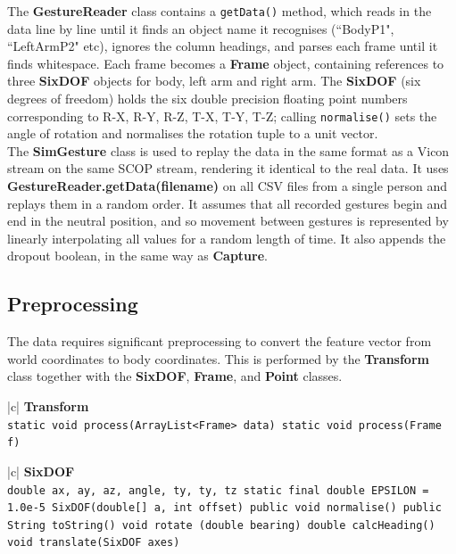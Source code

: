 \documentclass[12pt,a4,notitlepage]{report}
\renewcommand{\_}{\texttt{\symbol{95}}}
\newcommand{\<}{\texttt{\symbol{60}}}
\renewcommand{\>}{\texttt{\symbol{62}}}
\newcommand{\class}[1]{\textbf{#1}}
\newcommand{\variable}[1]{\texttt{#1}}
\begin{document}
The \class{GestureReader} class contains a \variable{getData()} method, which reads in the data line by line until it finds an object name it recognises (``BodyP1", ``LeftArmP2" etc), ignores the column headings, and parses each frame until it finds whitespace. Each frame becomes a \class{Frame} object, containing references to three \class{SixDOF} objects for body, left arm and right arm. The \class{SixDOF} (six degrees of freedom) holds the six double precision floating point numbers corresponding to \<R-X\>, \<R-Y\>, \<R-Z\>, \<T-X\>, \<T-Y\>, \<T-Z\>; calling \variable{normalise()} sets the angle of rotation and normalises the rotation tuple to a unit vector. \\
The \class{SimGesture} class is used to replay the data in the same format as a Vicon stream on the same SCOP stream, rendering it identical to the real data. It uses \class{GestureReader.getData(filename)} on all CSV files from a single person and replays them in a random order. It assumes that all recorded gestures begin and end in the neutral position, and so movement between gestures is represented by linearly interpolating all values for a random length of time. It also appends the dropout boolean, in the same way as \class{Capture}.

\subsection{Preprocessing}

The data requires significant preprocessing to convert the feature vector from world coordinates to body coordinates. This is performed by the \class{Transform} class together with the \class{SixDOF}, \class{Frame}, and \class{Point} classes.

\begin{tabular}{|c|} \hline 
\class{Transform} \\ \hline
{}
{ \variable{static void process(ArrayList<Frame> data) \newline
static void process(Frame f)
} } \\ \hline
\end{tabular}

\begin{tabular}{|c|} \hline 
\class{SixDOF} \\ \hline
{}
{\variable{double ax, ay, az, angle, ty, ty, tz \newline
  static final double EPSILON = 1.0e-5 \newline
  SixDOF(double[] a, int offset) \newline
  public void normalise() \newline
  public String toString() \newline
  void rotate (double bearing) \newline
  double calcHeading() \newline
  void translate(SixDOF axes)
} } \\ \hline
\end{tabular}
\end{document}
